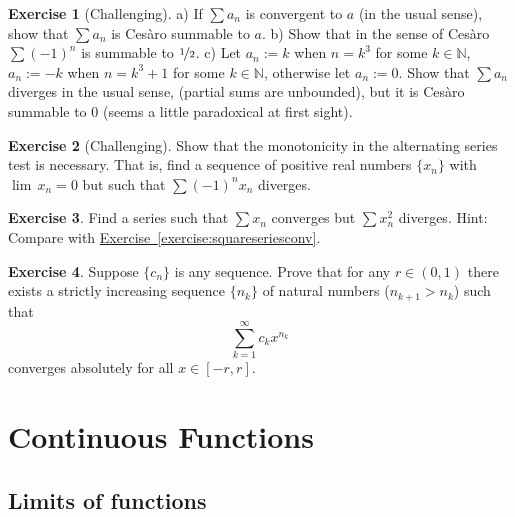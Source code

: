 \documentclass[12pt]{book}
\newcommand{\N}{{\mathbb{N}}}
\theoremstyle{plain}
\theoremstyle{remark}
\theoremstyle{definition}
\theoremstyle{exercise}
\newtheorem{exercise}{Exercise}[section]
\theoremstyle{example}
\newcommand{\exerciseref}[1]{\hyperref[#1]{Exercise~\ref*{#1}}}
\begin{document}
\begin{exercise}[Challenging]
a) If $\sum a_n$ is convergent to $a$ (in the usual sense), show that
$\sum a_n$ is Ces{\`a}ro summable to $a$.
b) Show that in the sense of Ces{\`a}ro $\sum {(-1)}^n$ is summable to
$\nicefrac{1}{2}$.
c) Let $a_n := k$ when $n = k^3$ for some $k \in \N$,
$a_n := -k$ when $n = k^3+1$ for some $k \in \N$,
otherwise
let $a_n := 0$.  Show that $\sum a_n$ diverges in the usual sense,
(partial sums are unbounded), but it is
Ces{\`a}ro summable to 0 (seems a little paradoxical at first sight).
\end{exercise}

\begin{exercise}[Challenging]
Show that the monotonicity in the alternating series test
is necessary.  That is, find a sequence of positive real numbers
$\{ x_n \}$ with $\lim\, x_n = 0$ but such that
$\sum {(-1)}^n x_n$ diverges.
\end{exercise}

\begin{exercise}
Find a series such that $\sum x_n$ converges but $\sum x_n^2$ diverges.
Hint: Compare with \exerciseref{exercise:squareseriesconv}.
\end{exercise}

\begin{exercise}
Suppose $\{ c_n \}$ is any sequence.  Prove that for any $r \in (0,1)$
there exists a strictly increasing sequence $\{ n_k \}$ of natural numbers ($n_{k+1} > n_k$) such that
\begin{equation*}
\sum_{k=1}^\infty c_k x^{n_k}
\end{equation*}
converges absolutely for all $x \in [-r,r]$.
\end{exercise}



\chapter{Continuous Functions} \label{lim:chapter}


\section{Limits of functions}
\label{sec:limoffunc}
\end{document}
